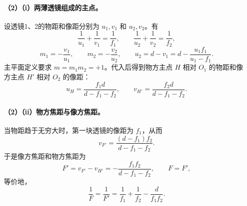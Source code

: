 \paragraph{（2）（i）两薄透镜组成的主点。}
设透镜1、2的物距和像距分别为 $u_1,v_1$ 和 $u_2,v_2$。有
\[
\frac1{u_1}+\frac1{v_1}=\frac1{f_1},
\qquad
\frac1{u_2}+\frac1{v_2}=\frac1{f_2},
\]
\[
m_1=-\frac{v_1}{u_1},\qquad m_2=-\frac{v_2}{u_2},
\qquad u_2=d-v_1=d-\frac{u_1f_1}{u_1-f_1}.
\]
主平面定义要求 $m=m_1m_2=+1$。代入后得到物方主点 $H$ 相对 $O_1$ 的物距和像方主点 $H'$ 相对 $O_2$ 的像距：
\[
u_H=\frac{f_1d}{d-f_1-f_2},
\qquad
v_{H'}=\frac{f_2d}{d-f_1-f_2}.
\]
\paragraph{（2）（ii）物方焦距与像方焦距。}
当物距趋于无穷大时，第一块透镜的像距为 $f_1$，从而
\[
v_{F'}=\frac{(d-f_1)f_2}{d-f_1-f_2}.
\]
于是像方焦距和物方焦距为
\[
F'=v_{F'}-v_{H'}=-\frac{f_1f_2}{d-f_1-f_2},
\qquad
F=F',
\]
等价地，
\[
\frac1F=\frac1{F'}=\frac1{f_1}+\frac1{f_2}-\frac{d}{f_1f_2}.
\]

